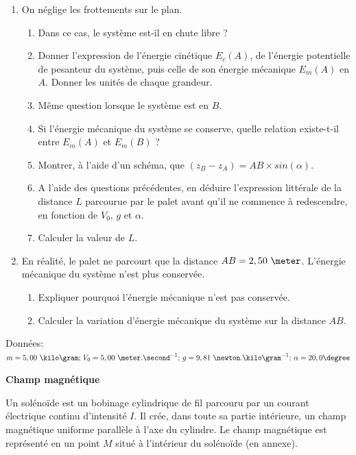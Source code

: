 \begin{enumerate}
\item On néglige les frottements sur le plan. \begin{enumerate}[label=(\alph*)]
\item Dans ce cas, le système est-il en chute libre ?
\item Donner l'expression de l'énergie cinétique $E_{c}(A)$, de l'énergie potentielle de pesanteur du système, puis celle de son énergie mécanique $E_{m}(A)$ en $A$. Donner les unités de chaque grandeur.
\item Même question lorsque le système est en $B$.
\item Si l'énergie mécanique du système se conserve, quelle relation existe-t-il entre $E_{m}(A)$ et $E_{m}(B)$ ?
\item Montrer, à l'aide d'un schéma, que $(z_{B}-z_{A}) = AB \times sin(\alpha)$.
\item A l'aide des questions précédentes, en déduire l'expression littérale de la distance $L$ parcourue par le palet avant qu'il ne commence à redescendre, en fonction de $V_{0}$, $g$ et $\alpha$.
\item Calculer la valeur de $L$.
\end{enumerate}
\item En réalité, le palet ne parcourt que la distance $AB = 2,50\text{ }\meter$. L'énergie mécanique du système n'est plus conservée.
\begin{enumerate}[label=(\alph*)]
\item Expliquer pourquoi l'énergie mécanique n'est pas conservée.
\item Calculer la variation d'énergie mécanique du système sur la distance $AB$.
\end{enumerate}
\end{enumerate}

\vspace{0.3cm}

Données: $m=5,00\text{ }\kilo\gram\text{; }V_{0}=5,00\text{ }\meter.\second^{-1}\text{; }g=9,81\text{ }\newton.\kilo\gram^{-1}\text{; }\alpha = 20,0 \degree$

\vspace{0.3cm}

\exo \textbf{Champ magnétique}

\vspace{0.3cm}

Un solénoïde est un bobinage cylindrique de fil parcouru par un courant électrique continu d'intensité $I$. Il crée, dans toute sa partie intérieure, un champ magnétique uniforme parallèle à l'axe du cylindre. Le champ magnétique est représenté en un point $M$ situé à l'intérieur du solénoïde (en annexe).

